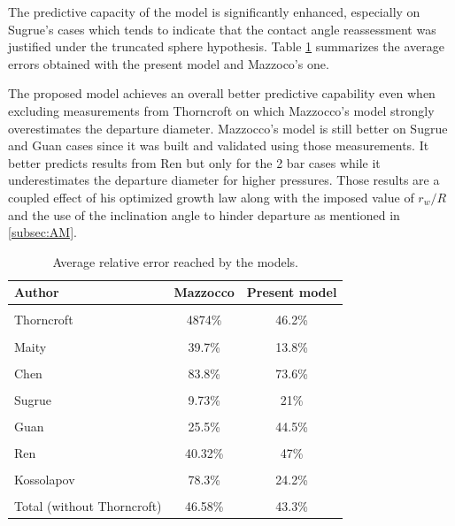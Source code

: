 \npar


The predictive capacity of the model is significantly enhanced, especially on Sugrue's cases which tends to indicate that the contact angle reassessment was justified under the truncated sphere hypothesis. Table \ref{tab:mod_errors} summarizes the average errors obtained with the present model and Mazzoco's one.

\npar

The proposed model achieves an overall better predictive capability even when excluding measurements from Thorncroft on which Mazzocco's model strongly overestimates the departure diameter. Mazzocco's model is still better on Sugrue and Guan cases since it was built and validated using those measurements. It better predicts results from Ren but only for the 2 bar cases while it underestimates the departure diameter for higher pressures. Those results are a coupled effect of his optimized growth law along with the imposed value of $r_{w}/R$ and the use of the inclination angle to hinder departure as mentioned in \ref{subsec:AM}.


\begin{table}[h!]

\scriptsize
\centering
\begin{tabular}[b]{p{30mm}|c c } 
Author & Mazzocco & Present model\\
\hline
\\
Thorncroft & 4874\% & 46.2\% \\
\\
Maity & 39.7\% & 13.8\%  \\
\\
Chen & 83.8\% & 73.6\% \\
\\
Sugrue & 9.73\% & 21\% \\
\\
Guan & 25.5\% & 44.5\% \\
\\
Ren & 40.32\% & 47\% \\
\\
Kossolapov & 78.3\% & 24.2\% \\
\\
Total \newline (without Thorncroft) & {46.58\%} & {43.3\%}\\
\hline
\end{tabular}
\caption{Average relative error reached by the models.}
\label{tab:mod_errors}
\end{table}

\npar


